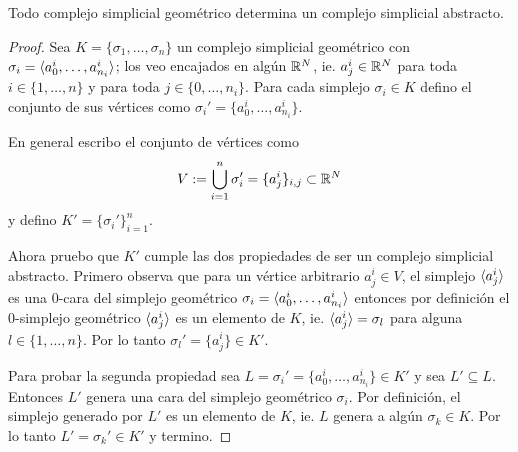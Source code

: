 \begin{ejercicio}\label{ej:47}
  Todo complejo simplicial geom\'etrico determina un complejo simplicial abstracto.
\end{ejercicio}
\begin{proof}%
  Sea $K=\{\sigma_1,\ldots,\sigma_n\}$ un complejo simplicial geom\'etrico con
  $\sigma_i=\langle a_0^i,\ldots,a_{n_i}^i \rangle$; los veo encajados en alg\'un $\mathbb{R}^N$, ie. $a_j^i\in\mathbb{R}^N$
  para toda $i\in\{1,\ldots,n\}$ y para toda $j\in\{0,\ldots,n_i\}$. Para cada simplejo
  $\sigma_i\in K$ defino el conjunto de sus v\'ertices como $\sigma_i'=\{a_0^i,\ldots,a_{n_i}^i\}$.

  En general escribo el conjunto de v\'ertices como
  \[
    V:=\bigcup_{i=1}^n\sigma_i'=\{a_j^i\}_{i,j}\subset\mathbb{R}^N
  \]
  y defino $K'=\{\sigma_i'\}_{i=1}^n$.

  Ahora pruebo que $K'$ cumple las dos propiedades de ser un complejo simplicial abstracto.
  Primero observa que para un v\'ertice arbitrario $a_j^i\in V$, el simplejo $\langle a_j^i \rangle$ es
  una $0$-cara del simplejo geom\'etrico $\sigma_i=\langle a_0^i,\ldots,a_{n_i}^i \rangle$ entonces por
  definici\'on el 0-simplejo geom\'etrico $\langle a_j^i \rangle$ es un elemento de $K$, ie. $\langle a_j^i \rangle=\sigma_l$
  para alguna $l\in\{1,\ldots,n\}$. Por lo tanto $\sigma_l'=\{a_j^i\}\in K'$.

  Para probar la segunda propiedad sea $L=\sigma_i'=\{a_0^i,\ldots,a_{n_i}^i\}\in K'$ y sea
  $L'\subseteq L$. Entonces $L'$ genera una cara del simplejo geom\'etrico $\sigma_i$. Por definici\'on,
  el simplejo generado por $L'$ es un elemento de $K$, ie. $L$ genera a alg\'un $\sigma_k\in K$.
  Por lo tanto $L'=\sigma_k'\in K'$ y termino.
\end{proof}%

